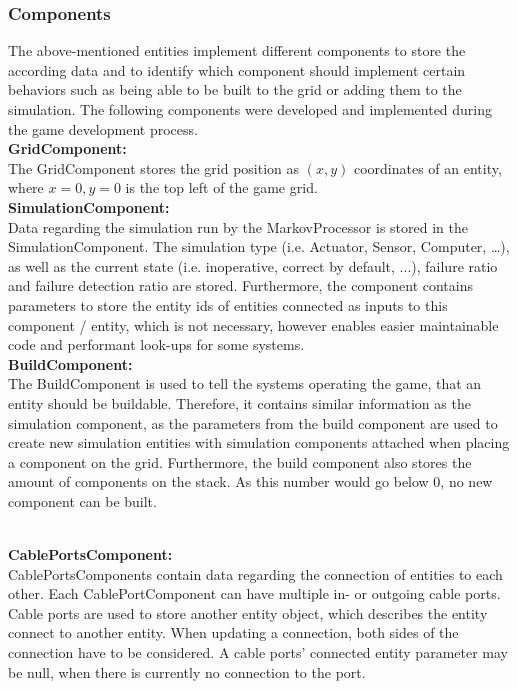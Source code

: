\subsubsection{Components}\label{subsubsec:components2}
The above-mentioned entities implement different components to store the according data and to identify which component
should implement certain behaviors such as being able to be built to the grid or adding them to the simulation.
The following components were developed and implemented during the game development process.
\\
\textbf{GridComponent:} \\
The GridComponent stores the grid position as $(x,y)$ coordinates of an entity, where $x=0, y=0$ is the top left of the game grid.
\\
\textbf{SimulationComponent:} \\
Data regarding the simulation run by the MarkovProcessor is stored in the SimulationComponent.
The simulation type (i.e. Actuator, Sensor, Computer, \ldots), as well as the current state (i.e. inoperative, correct by default, ...), failure
ratio and failure detection ratio are stored.
Furthermore, the component contains parameters to store the entity ids of entities connected as inputs to this component / entity, which is
not necessary, however enables easier maintainable code and performant look-ups for some systems.
\\
\textbf{BuildComponent:} \\
The BuildComponent is used to tell the systems operating the game, that an entity should be buildable.
Therefore, it contains similar information as the simulation component, as the parameters from the build component are used
to create new simulation entities with simulation components attached when placing a component on the grid.
Furthermore, the build component also stores the amount of components on the stack.
As this number would go below 0, no new component can be built.

\\
\textbf{CablePortsComponent:} \\
CablePortsComponents contain data regarding the connection of entities to each other.
Each CablePortComponent can have multiple in- or outgoing cable ports.
Cable ports are used to store another entity object, which describes the entity connect to another entity.
When updating a connection, both sides of the connection have to be considered.
A cable ports' connected entity parameter may be null, when there is currently no connection to the port.

